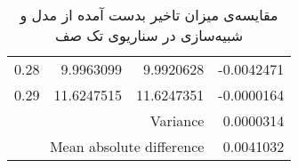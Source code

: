 \begin{table}
\begin{latin}
\begin{tabular}{rrrr}
			0.28                     & 9.9963099                                  & 9.9920628                                     & -0.0042471                \\
			0.29                     & 11.6247515                                 & 11.6247351                                    & -0.0000164                \\ \hline
			\multicolumn{3}{r}{Variance}                                                                                          & 0.0000314                 \\
			\multicolumn{3}{r}{Mean absolute difference}                                                                          & 0.0041032                 \\ \hline
		\end{tabular}
	\end{latin}
	\caption{مقایسه‌ی میزان تاخیر بدست آمده از مدل و شبیه‌سازی در سناریوی تک صف}
	\label{table:scenario1}
\end{table}

